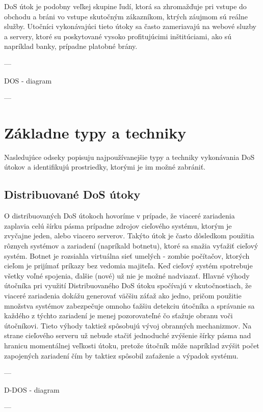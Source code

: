 \documentclass[
  printed, %
  table,   %
  lof,     %
  lot,     %
]{fithesis3}
\begin{document}
DoS útok je podobny veľkej skupine ľudí, ktorá sa zhromažďuje pri vstupe do obchodu a
bráni vo vstupe skutočným zákazníkom, ktrých záujmom sú reálne služby.
Utočníci vykonávajúci tieto útoky sa často zameriavajú na webové sluzby a servery,
ktoré su poskytované vysoko profitujúcimi inštitúciami, ako sú napríklad banky,
prípadne platobné brány.

---

DOS - diagram

---

\section{Základne typy a techniky}
Nasledujúce odseky popisuju najpoužívanejšie typy a techniky vykonávania DoS útokov a
identifikujú prostriedky, ktorými je im možné zabrániť.

\subsection{Distribuované DoS útoky}
O distribuovaných DoS útokoch hovoríme v prípade, že viaceré zariadenia zaplavia celú šírku pásma prípadne zdrojov cieľového systému, ktorým je zvyčajne jeden, alebo viacero serverov. Takýto útok je často dôsledkom použitia rôznych systémov a zariadení (napríkald botnetu), ktoré sa snažia vyťažiť cieľový systém. Botnet je rozsiahla virtuálna sieť umelých - zombie počítačov, ktorých cieľom je prijímať príkazy bez vedomia majiteľa. Keď cieľový systém spotrebuje všetky voľné spojenia, ďalšie (nové) už nie je možné nadviazať. Hlavné výhody útočníka pri využití Distribuovaného DoS útoku spočívajú v skutočnostiach, že viaceré zariadenia dokážu generovať väčšiu záťaž ako jedno, pričom použitie množstva systémov zabezpečuje omnoho ťažšiu detekciu útočníka a správanie sa každého z týchto zariadení je menej pozorovateľné čo sťažuje obranu voči útočníkovi. Tieto výhody taktiež spôsobujú vývoj obranných mechanizmov. Na strane cieľového serveru už nebude stačiť jednoduché zvýšenie šírky pásma nad hranicu momentálnej veľkosti útoku, pretože útočník môže napríklad zvýšit počet zapojených zariadení čím by taktiez spôsobil zaťaženie a výpadok systému.

---

D-DOS - diagram

---
\end{document}
